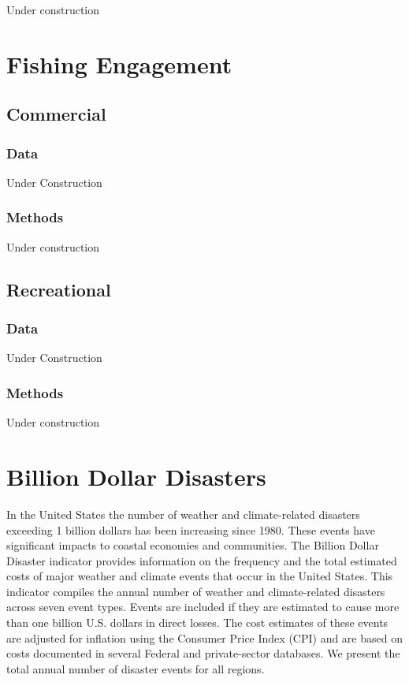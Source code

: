 \documentclass[
]{book}
\begin{document}
Under construction

\hypertarget{fishing-engagement}{%
\chapter{Fishing Engagement}\label{fishing-engagement}}

\hypertarget{commercial}{%
\section{Commercial}\label{commercial}}

\hypertarget{data-19}{%
\subsection{Data}\label{data-19}}

Under Construction

\hypertarget{methods-19}{%
\subsection{Methods}\label{methods-19}}

Under construction

\hypertarget{recreational}{%
\section{Recreational}\label{recreational}}

\hypertarget{data-20}{%
\subsection{Data}\label{data-20}}

Under Construction

\hypertarget{methods-20}{%
\subsection{Methods}\label{methods-20}}

Under construction

\hypertarget{billion-dollar-disasters}{%
\chapter{Billion Dollar Disasters}\label{billion-dollar-disasters}}

In the United States the number of weather and climate-related disasters exceeding 1 billion dollars has been increasing since 1980. These events have significant impacts to coastal economies and communities. The Billion Dollar Disaster indicator provides information on the frequency and the total estimated costs of major weather and climate events that occur in the United States. This indicator compiles the annual number of weather and climate-related disasters across seven event types. Events are included if they are estimated to cause more than one billion U.S. dollars in direct losses. The cost estimates of these events are adjusted for inflation using the Consumer Price Index (CPI) and are based on costs documented in several Federal and private-sector databases. We present the total annual number of disaster events for all regions.
\end{document}

